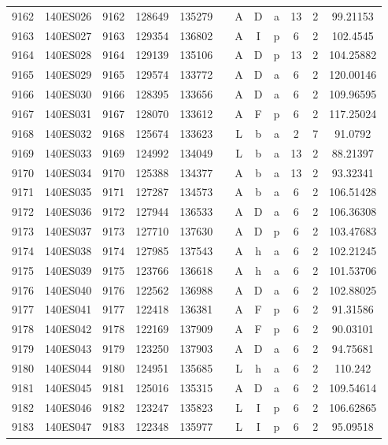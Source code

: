 \begin{tabular}{|*{12}{c|}}
9162 & 140ES026 & 9162 & 128649 & 135279 &  & A & D & a & 13 & 2 & 99.21153 \\ 
9163 & 140ES027 & 9163 & 129354 & 136802 &  & A & I & p & 6 & 2 & 102.4545 \\ 
9164 & 140ES028 & 9164 & 129139 & 135106 &  & A & D & p & 13 & 2 & 104.25882 \\ 
9165 & 140ES029 & 9165 & 129574 & 133772 &  & A & D & a & 6 & 2 & 120.00146 \\ 
9166 & 140ES030 & 9166 & 128395 & 133656 &  & A & D & a & 6 & 2 & 109.96595 \\ 
9167 & 140ES031 & 9167 & 128070 & 133612 &  & A & F & p & 6 & 2 & 117.25024 \\ 
9168 & 140ES032 & 9168 & 125674 & 133623 &  & L & b & a & 2 & 7 & 91.0792 \\ 
9169 & 140ES033 & 9169 & 124992 & 134049 &  & L & b & a & 13 & 2 & 88.21397 \\ 
9170 & 140ES034 & 9170 & 125388 & 134377 &  & A & b & a & 13 & 2 & 93.32341 \\ 
9171 & 140ES035 & 9171 & 127287 & 134573 &  & A & b & a & 6 & 2 & 106.51428 \\ 
9172 & 140ES036 & 9172 & 127944 & 136533 &  & A & D & a & 6 & 2 & 106.36308 \\ 
9173 & 140ES037 & 9173 & 127710 & 137630 &  & A & D & p & 6 & 2 & 103.47683 \\ 
9174 & 140ES038 & 9174 & 127985 & 137543 &  & A & h & a & 6 & 2 & 102.21245 \\ 
9175 & 140ES039 & 9175 & 123766 & 136618 &  & A & h & a & 6 & 2 & 101.53706 \\ 
9176 & 140ES040 & 9176 & 122562 & 136988 &  & A & D & a & 6 & 2 & 102.88025 \\ 
9177 & 140ES041 & 9177 & 122418 & 136381 &  & A & F & p & 6 & 2 & 91.31586 \\ 
9178 & 140ES042 & 9178 & 122169 & 137909 &  & A & F & p & 6 & 2 & 90.03101 \\ 
9179 & 140ES043 & 9179 & 123250 & 137903 &  & A & D & a & 6 & 2 & 94.75681 \\ 
9180 & 140ES044 & 9180 & 124951 & 135685 &  & L & h & a & 6 & 2 & 110.242 \\ 
9181 & 140ES045 & 9181 & 125016 & 135315 &  & A & D & a & 6 & 2 & 109.54614 \\ 
9182 & 140ES046 & 9182 & 123247 & 135823 &  & L & I & p & 6 & 2 & 106.62865 \\ 
9183 & 140ES047 & 9183 & 122348 & 135977 &  & L & I & p & 6 & 2 & 95.09518 \\ 

\end{tabular}
